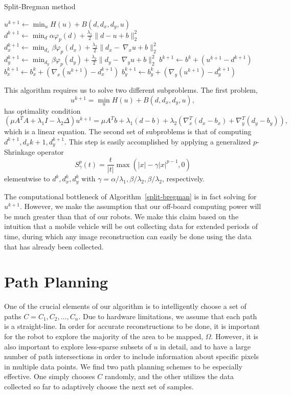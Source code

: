 \documentclass[english]{article}\usepackage[]{graphicx}\usepackage[]{color}
\begin{document}
\begin{algorithm}[H]
\caption{Split-Bregman method}\label{split-bregman}
\begin{algorithmic}[1]
\State $u^{k+1}\gets \min_u{H(u)+B(d,d_x,d_y,u)}$
\State $d^{k+1}\gets \min_d{\alpha\varphi_p(d)+\frac{\lambda_1}{2}\|d-u+b\|_2^2}$
\State $d_x^{k+1}\gets \min_{d_x}{\beta\varphi_p(d_x)+\frac{\lambda_2}{2}\|d_x-\ \nabla_xu+b\|_2^2}$
\State $d_y^{k+1}\gets \min_{d_y}{\beta\varphi_p(d_y)+\frac{\lambda_2}{2}\|d_y-\ \nabla_yu+b\|_2^2}$
\EndFor
\State $b^{k+1}\gets b^{k}+\left(u^{k+1}-d^{k+1}\right)$
\State $b_x^{k+1}\gets b_x^{k}+\left(\nabla_x \left(u^{k+1}\right) - d_x^{k+1}\right)$
\State $b_y^{k+1}\gets b_y^{k}+\left(\nabla_y \left(u^{k+1}\right) - d_y^{k+1}\right)$
\EndWhile

\EndProcedure
\end{algorithmic}
\end{algorithm}

This algorithm requires us to solve two different subproblems. The first problem, \[u^{k+1}=\min_u{H(u)+B(d,d_x,d_y,u)},\] has optimality condition
\[\left(\mu A^TA + \lambda_1I - \lambda_2\Delta\right)u^{k+1}=\mu A^Tb + \lambda_1(d-b)+\lambda_2\left(\nabla_x^T(d_x-b_x)+\nabla_y^T(d_y-b_y)\right),\]
which is a linear equation. The second set of subproblems is that of computing $d^{k+1},d_x{k+1},d_y^{k+1}$. This step is easily 
accomplished by applying a generalized $p$-Shrinkage operator
\[S_\gamma^p(t)=\frac{t}{|t|}\max\left({|x|-\gamma|x|^{p-1},0}\right)\]
elementwise to $d^k,d_x^k,d_y^k$ with $\gamma = \alpha/\lambda_1, \beta/\lambda_2, \beta/\lambda_2$, respectively.

The computational bottleneck of Algorithm~\ref{split-bregman} is in fact solving for $u^{k+1}$. However, we make the assumption that 
our off-board computing power will be much greater than that of our robots. We make this claim based on the intuition that a mobile vehicle will be out collecting data for extended periods of time, during which any image reconstruction can easily be done using the data that has already been collected.

\section{Path Planning}

One of the crucial elements of our algorithm is to intelligently choose a set of paths $C=C_1,C_2,\dots,C_n$. Due to hardware 
limitations, we assume that each path is a straight-line. In order 
for accurate reconstructions to be done, it is important for the robot to explore the majority of the area to 
be mapped, $\Omega$. However, it is also important to explore less-sparse subsets of $u$ in detail, and to have a large number 
of path intersections in order to include information about specific pixels in multiple data points. We find two path planning schemes 
to be especially effective. One simply chooses $C$ randomly, and the other utilizes the data collected so far to adaptively choose the next set of samples.
\end{document}
